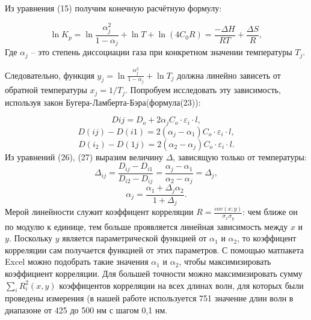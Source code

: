 \documentclass[a4paper,12pt]{article} %
\begin{document}
Из уравнения (15) получим конечную расчётную формулу:

\begin{equation}
\ln K_p = \ln \frac{ \alpha_j^2}{1 - \alpha_j} + \ln T + \ln (4C_0 R) = \frac{-\Delta H}{RT} + \frac{\Delta S}{R},
\end{equation}
Где $\alpha_j$ -- это степень диссоциации газа при конкретном значении температуры $T_j$. 

Следовательно, функция $y_j =  \ln \frac{ \alpha_j^2}{1 - \alpha_j} + \ln T_j $ должна линейно зависеть от обратной температуры $x_j = 1/T_j$. 
Попробуем исследовать эту зависимость, используя закон Бугера-Ламберта-Бэра(формула(23)): 


\begin{equation}
D{ij} =D_o + 2\alpha_jC_o \cdot \varepsilon_i \cdot l,
\end{equation}
\begin{equation}
D(ij) - D(i1) =2(\alpha_j - \alpha_1)C_o \cdot \varepsilon_i\cdot l,
\end{equation}
\begin{equation}
D(i_2) - D(1j) =2( \alpha_2 - \alpha_j)C_o \cdot \varepsilon_i \cdot l.
\end{equation}
Из уравнений (26), (27) выразим величину $\Delta$, зависящую только от температуры:
\begin{equation}
\Delta_{ij} = \frac{D_{ij} - D_{i1}}{D_{i2} - D_{ij}} = \frac{\alpha_{j} - \alpha_{1}}{\alpha_{2} - \alpha_{j}} = \Delta_{j},
\end{equation}
\begin{equation}
\alpha_j = \frac{\alpha_1 + \Delta_{j}\alpha_2}{1 + \Delta_{j}}.
\end{equation}
Мерой линейности служит коэффицент корреляции $R = \frac{cov(x;y)}{\sigma_x\sigma_y}$: чем ближе он по модулю к единице, тем больше проявляется линейная зависимость между  $x$ и $y$. Поскольку $y$ является параметрической функцией от $\alpha_1$ и $\alpha_2$, то коэффицент корреляции сам получается функцией от этих параметров. С помощью матпакета Excel можно подобрать такие значения $\alpha_1$ и $\alpha_2$, чтобы максимизировать коэффициент корреляции. Для большей точности можно максимизировать сумму $\sum_{i}R_i^2(x, y)$ коэффицентов корреляции на всех длинах волн, для которых были проведены измерения (в нашей работе используется 751 значение длин волн в диапазоне от 425 до 500 нм с шагом 0,1 нм.
\end{document}

